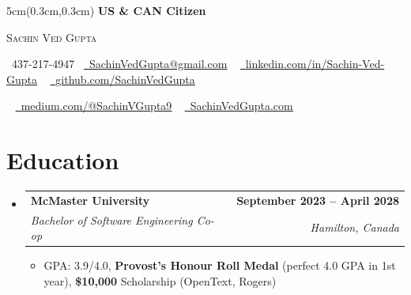 \documentclass[letterpaper,11pt]{article}
\makeatletter
\newcommand{\resumeItem}[1]{
  \item\small{
    {#1 \vspace{-2pt}}
  }
}
\newcommand{\resumeSubheading}[4]{
  \vspace{-2pt}\item
    \begin{tabular*}{1.0\textwidth}[t]{l@{\extracolsep{\fill}}r}
      \textbf{#1} & \textbf{\small #2} \\
      \textit{\small#3} & \textit{\small #4} \\
    \end{tabular*}\vspace{-7pt}
}
\newcommand{\resumeSubHeadingListStart}{\begin{itemize}[leftmargin=0.0in, label={}]}
\newcommand{\resumeSubHeadingListEnd}{\end{itemize}}
\newcommand{\resumeItemListStart}{\begin{itemize}}
\newcommand{\resumeItemListEnd}{\end{itemize}\vspace{-5pt}}
\makeatother
\begin{document}
\begin{textblock*}{5cm}(0.3cm,0.3cm) %
\textbf{US \& CAN Citizen}
\end{textblock*}






\begin{center}

    
    {\Huge \scshape Sachin Ved Gupta} \\ \vspace{8pt}

    \small \raisebox{-0.1\height}\faPhone\ 437-217-4947~ \href{SachinVedGupta@gmail.com}{\raisebox{-0.2\height}\faEnvelope\  \underline{SachinVedGupta@gmail.com}} ~ 
    \href{https://linkedin.com/in//Sachin-Ved-Gupta}{\raisebox{-0.2\height}\faLinkedin\ \underline{linkedin.com/in/Sachin-Ved-Gupta}}  ~
    \href{https://github.com/SachinVedGupta}{\raisebox{-0.2\height}\faGithub\ \underline{github.com/SachinVedGupta}}
    \vspace{6pt}

    \small \raisebox{-0.1\height}~ \href{https://medium.com/@sachinvgupta9}{\raisebox{-0.2\height}\faBookReader\  \underline{medium.com/@SachinVGupta9}} ~ 
    \href{https://sachinvedgupta.com/}{\raisebox{-0.2\height}\faUser\ \underline{SachinVedGupta.com}}  
    \vspace{-20pt}
\end{center}







\vspace{0.2cm}







\section{Education}
  \resumeSubHeadingListStart
    \resumeSubheading
      {McMaster University}{September 2023 -- April 2028}
      {Bachelor of Software Engineering Co-op}{Hamilton, Canada}
      \resumeItemListStart
        \resumeItem{GPA: 3.9/4.0, \textbf{Provost’s Honour Roll Medal} (perfect 4.0 GPA in 1st year), \textbf{\$10,000} Scholarship (OpenText, Rogers)}
      \resumeItemListEnd
  \resumeSubHeadingListEnd
\end{document}
